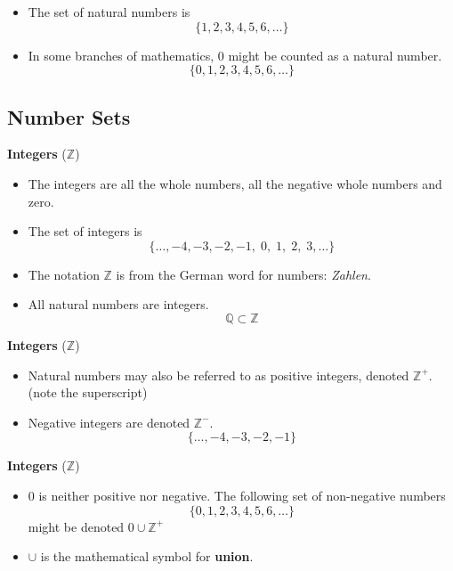 \documentclass[11pt,a4paper,titlepage,oneside,openany]{article}
\numberwithin{equation}{section}
\numberwithin{algorithm}{section}
\numberwithin{figure}{section}
\numberwithin{table}{section}
\begin{document}
{\begin{itemize}
\item The set of natural numbers is 
\[\{1,2,3,4,5,6,\ldots\} \]
\item In some branches of mathematics, $0$ might be counted as a natural number.
\[\{0,1,2,3,4,5,6,\ldots\} \]
\end{itemize}



\subsection{Number Sets}


\textbf{Integers} ($\mathbb{Z}$)
\begin{itemize}
\item The integers are all the whole numbers, all the negative whole numbers and zero.

\item The set of integers is 
\[\{\ldots,-4,-3,-2,-1,\;0,\;1,\;2,\;3,\ldots\} \]
\item The notation $\mathbb{Z}$ is from the German word for numbers: \textit{Zahlen}. 
\item All natural numbers are integers.
\[ \mathbb{Q}  \subset \mathbb{Z}\]
\end{itemize}




\textbf{Integers} ($\mathbb{Z}$)
\begin{itemize}
\item Natural numbers may also be referred to as positive integers, denoted $\mathbb{Z}^{+}$. \\(note the superscript)
\item Negative integers are denoted $\mathbb{Z}^{-}$.
\[\{\ldots,-4,-3,-2,-1\}\]
\end{itemize}


\textbf{Integers} ($\mathbb{Z}$)
\begin{itemize}
\item 0 is neither positive nor negative. The following set of non-negative numbers \[\{0,1,2,3,4,5,6,\ldots\} \] might be denoted $0 \cup \mathbb{Z}^{+}$
\item $\cup$ is the mathematical symbol for \textbf{union}.
\end{itemize}



}
\end{document}
